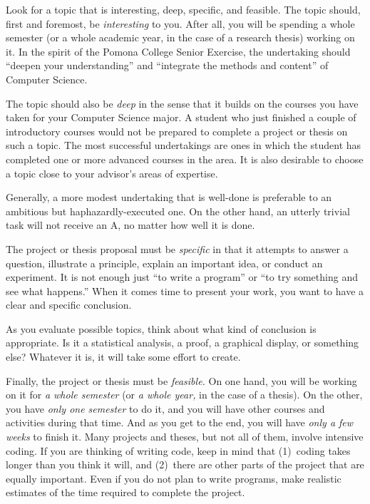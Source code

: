 \documentclass[finalcopy]{srpaper}
\begin{document}
Look for a topic that is interesting, deep, specific, and
feasible. The topic should, first and foremost, be
\emph{interesting} to you. After all, you will be spending a
whole semester (or a whole academic year, in the case of a
research thesis) working on it. In the spirit of the Pomona
College Senior Exercise, the undertaking should ``deepen
your understanding'' and ``integrate the methods and
content'' of Computer Science.

The topic should also be \emph{deep} in the sense that it
builds on the courses you have taken for your Computer
Science major. A student who just finished a couple of
introductory courses would not be prepared to complete a
project or thesis on such a topic. The most successful
undertakings are ones in which the student has completed one
or more advanced courses in the area. It is also desirable
to choose a topic close to your advisor's areas of
expertise.

Generally, a more modest undertaking that is well-done is
preferable to an ambitious but haphazardly-executed one. On
the other hand, an utterly trivial task will not receive an
A, no matter how well it is done.

The project or thesis proposal must be \emph{specific} in
that it attempts to answer a question, illustrate a
principle, explain an important idea, or conduct an
experiment. It is not enough just ``to write a program'' or
``to try something and see what happens.'' When it comes
time to present your work, you want to have a clear and
specific conclusion.

As you evaluate possible topics, think about what kind of
conclusion is appropriate. Is it a statistical analysis, a
proof, a graphical display, or something else? Whatever it
is, it will take some effort to create.

Finally, the project or thesis must be \emph{feasible.} On
one hand, you will be working on it for \emph{a whole
semester} (or \emph{a whole year,} in the case of a
thesis). On the other, you have \emph{only one semester} to
do it, and you will have other courses and activities during
that time.  And as you get to the end, you will have
\emph{only a few weeks} to finish it.  Many projects and
theses, but not all of them, involve intensive coding. If
you are thinking of writing code, keep in mind that
(1)~coding takes longer than you think it will, and
(2)~there are other parts of the project that are equally
important. Even if you do not plan to write programs, make
realistic estimates of the time required to complete the
project.
\end{document}
